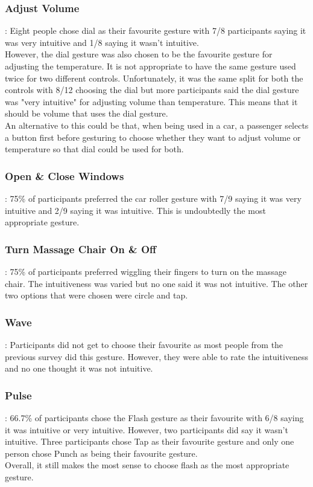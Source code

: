 \documentclass{l4proj}
\begin{document}
\subsubsection{Adjust Volume}: Eight people chose dial as their favourite gesture with 7/8 participants saying it was very intuitive and 1/8 saying it wasn't intuitive.\\
However, the dial gesture was also chosen to be the favourite gesture for adjusting the temperature. It is not appropriate to have the same gesture used twice for two different controls. Unfortunately, it was the same split for both the controls with 8/12 choosing the dial but more participants said the dial gesture was "very intuitive" for adjusting volume than temperature. This means that it should be volume that uses the dial gesture.\\
An alternative to this could be that, when being used in a car, a passenger selects a button first before gesturing to choose whether they want to adjust volume or temperature so that dial could be used for both.
\subsubsection{Open \& Close Windows}: 75\% of participants preferred the car roller gesture with 7/9 saying it was very intuitive and 2/9 saying it was intuitive. This is undoubtedly the most appropriate gesture.
\subsubsection{Turn Massage Chair On \& Off}: 75\% of participants preferred wiggling their fingers to turn on the massage chair. The intuitiveness was varied but no one said it was not intuitive.
The other two options that were chosen were circle and tap.
\subsubsection{Wave}: Participants did not get to choose their favourite as most people from the previous survey did this gesture. However, they were able to rate the intuitiveness and no one thought it was not intuitive.
\subsubsection{Pulse}: 66.7\% of participants chose the Flash gesture as their favourite with 6/8 saying it was intuitive or very intuitive. However, two participants did say it wasn't intuitive. Three participants chose Tap as their favourite gesture and only one person chose Punch as being their favourite gesture.\\
Overall, it still makes the most sense to choose flash as the most appropriate gesture.
\end{document}
